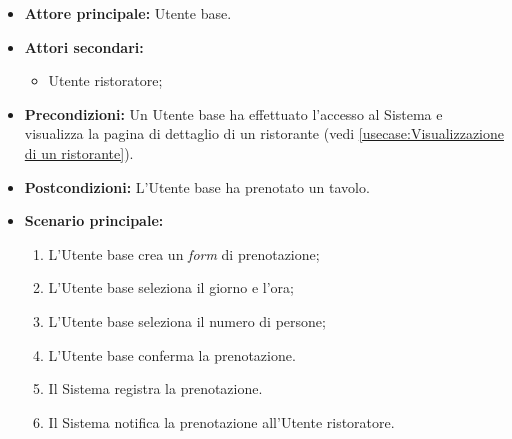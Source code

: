 \label{usecase:Prenotazione di un tavolo}
\begin{itemize}
	\item \textbf{Attore principale:} Utente base.
	\item \textbf{Attori secondari:}
	      \begin{itemize}
		      \item Utente ristoratore;
	      \end{itemize}
	\item \textbf{Precondizioni:}
	      Un Utente base ha effettuato l'accesso al Sistema e visualizza la
	      pagina di dettaglio di un ristorante (vedi \autoref{usecase:Visualizzazione di un ristorante}).
	\item \textbf{Postcondizioni:}
	      L'Utente base ha prenotato un tavolo.
	\item \textbf{Scenario principale:}
	      \begin{enumerate}
		      \item L'Utente base crea un \textit{form} di prenotazione;
		      \item L'Utente base seleziona il giorno e l'ora;
		      \item L'Utente base seleziona il numero di persone;
		      \item L'Utente base conferma la prenotazione.
		      \item Il Sistema registra la prenotazione.
		      \item Il Sistema notifica la prenotazione all'Utente ristoratore.
	      \end{enumerate}
\end{itemize}

